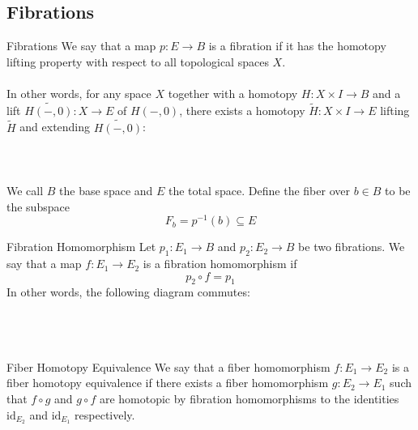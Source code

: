 \documentclass[a4paper]{article}
\begin{document}
\subsection{Fibrations}
\begin{defn}{Fibrations}{} We say that a map $p:E\to B$ is a fibration if it has the homotopy lifting property with respect to all topological spaces $X$. \\~\\

In other words, for any space $X$ together with a homotopy $H:X\times I\to B$ and a lift $\widetilde{H(-,0)}:X\to E$ of $H(-,0)$, there exists a homotopy $\widetilde{H}:X\times I\to E$ lifting $\widetilde{H}$ and extending $\widetilde{H(-,0)}$: \\~\\
\\~\\
We call $B$ the base space and $E$ the total space. Define the fiber over $b\in B$ to be the subspace $$F_b=p^{-1}(b)\subseteq E$$
\end{defn}

\begin{defn}{Fibration Homomorphism}{} Let $p_1:E_1\to B$ and $p_2:E_2\to B$ be two fibrations. We say that a map $f:E_1\to E_2$ is a fibration homomorphism if $$p_2\circ f=p_1$$ In other words, the following diagram commutes: \\~\\
\\~\\
\end{defn}

\begin{defn}{Fiber Homotopy Equivalence}{} We say that a fiber homomorphism $f:E_1\to E_2$ is a fiber homotopy equivalence if there exists a fiber homomorphism $g:E_2\to E_1$ such that $f\circ g$ and $g\circ f$ are homotopic by fibration homomorphisms to the identities $\text{id}_{E_2}$ and $\text{id}_{E_1}$ respectively. 
\end{defn}
\end{document}
